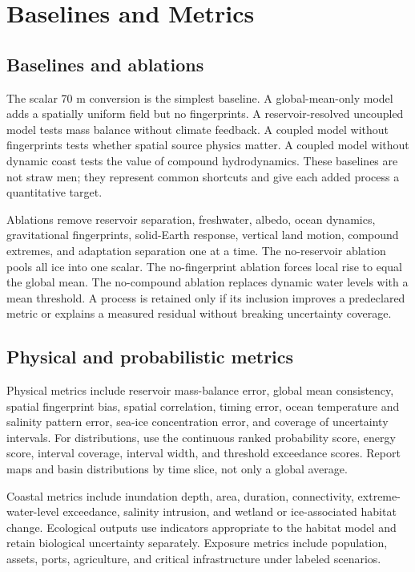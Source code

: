 \documentclass[conference]{IEEEtran}
\begin{document}
\section{Baselines and Metrics}

\subsection{Baselines and ablations}

The scalar 70 m conversion is the simplest baseline. A global-mean-only model adds a spatially uniform field but no fingerprints. A reservoir-resolved uncoupled model tests mass balance without climate feedback. A coupled model without fingerprints tests whether spatial source physics matter. A coupled model without dynamic coast tests the value of compound hydrodynamics. These baselines are not straw men; they represent common shortcuts and give each added process a quantitative target.

Ablations remove reservoir separation, freshwater, albedo, ocean dynamics, gravitational fingerprints, solid-Earth response, vertical land motion, compound extremes, and adaptation separation one at a time. The no-reservoir ablation pools all ice into one scalar. The no-fingerprint ablation forces local rise to equal the global mean. The no-compound ablation replaces dynamic water levels with a mean threshold. A process is retained only if its inclusion improves a predeclared metric or explains a measured residual without breaking uncertainty coverage.

\subsection{Physical and probabilistic metrics}

Physical metrics include reservoir mass-balance error, global mean consistency, spatial fingerprint bias, spatial correlation, timing error, ocean temperature and salinity pattern error, sea-ice concentration error, and coverage of uncertainty intervals. For distributions, use the continuous ranked probability score, energy score, interval coverage, interval width, and threshold exceedance scores. Report maps and basin distributions by time slice, not only a global average.

Coastal metrics include inundation depth, area, duration, connectivity, extreme-water-level exceedance, salinity intrusion, and wetland or ice-associated habitat change. Ecological outputs use indicators appropriate to the habitat model and retain biological uncertainty separately. Exposure metrics include population, assets, ports, agriculture, and critical infrastructure under labeled scenarios.
\end{document}
